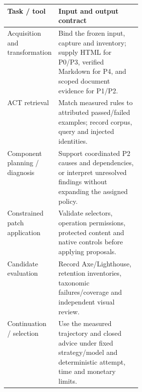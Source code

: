 \documentclass[acmsmall,screen,nonacm]{acmart}
\begin{document}
\begingroup\footnotesize\setlength{\tabcolsep}{3pt}\renewcommand{\arraystretch}{1.14}
\noindent\begin{tabular*}{\linewidth}{@{\extracolsep{\fill}}p{0.3200\linewidth}p{}@{}}\toprule
\raggedright\textbf{Task / tool} & \raggedright\textbf{Input and output contract}\tabularnewline\midrule
\raggedright Acquisition and transformation & \raggedright Bind the frozen input, capture and inventory; supply HTML for P0/P3, verified Markdown for P4, and scoped document evidence for P1/P2.\tabularnewline
\raggedright ACT retrieval & \raggedright Match measured rules to attributed passed/failed examples; record corpus, query and injected identities.\tabularnewline
\raggedright Component planning / diagnosis & \raggedright Support coordinated P2 causes and dependencies, or interpret unresolved findings without expanding the assigned policy.\tabularnewline
\raggedright Constrained patch application & \raggedright Validate selectors, operation permissions, protected content and native controls before applying proposals.\tabularnewline
\raggedright Candidate evaluation & \raggedright Record Axe/Lighthouse, retention inventories, taxonomic failures/coverage and independent visual review.\tabularnewline
\raggedright Continuation / selection & \raggedright Use the measured trajectory and closed advice under fixed strategy/model and deterministic attempt, time and monetary limits.\tabularnewline
\bottomrule\end{tabular*}\endgroup\par\medskip
\begingroup\footnotesize\setlength{\tabcolsep}{3pt}\renewcommand{\arraystretch}{1.14}
\end{document}

